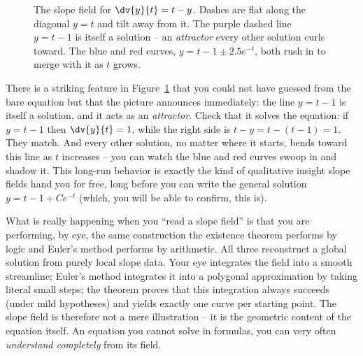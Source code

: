 \begin{figure}[H]
\centering
{}
\caption{The slope field for $\dv{y}{t}=t-y$. Dashes are flat along the diagonal $y=t$ and tilt away from it. The purple dashed line $y=t-1$ is itself a solution -- an \emph{attractor} every other solution curls toward. The blue and red curves, $y=t-1\pm 2.5e^{-t}$, both rush in to merge with it as $t$ grows.}
\label{ch36:fig-slopefield-ty}
\end{figure}

There is a striking feature in Figure~\ref{ch36:fig-slopefield-ty} that you could not have guessed from the bare equation but that the picture announces immediately: the line $y = t-1$ is itself a solution, and it acts as an \emph{attractor}. Check that it solves the equation: if $y = t-1$ then $\dv{y}{t} = 1$, while the right side is $t - y = t - (t-1) = 1$. They match. And every other solution, no matter where it starts, bends toward this line as $t$ increases -- you can watch the blue and red curves swoop in and shadow it. This long-run behavior is exactly the kind of qualitative insight slope fields hand you for free, long before you can write the general solution $y = t - 1 + Ce^{-t}$ (which, you will be able to confirm, this is).

\begin{happeningbox}
What is really happening when you ``read a slope field'' is that you are performing, by eye, the same construction the existence theorem performs by logic and Euler's method performs by arithmetic. All three reconstruct a global solution from purely local slope data. Your eye integrates the field into a smooth streamline; Euler's method integrates it into a polygonal approximation by taking literal small steps; the theorem proves that this integration always succeeds (under mild hypotheses) and yields exactly one curve per starting point. The slope field is therefore not a mere illustration -- it is the geometric content of the equation itself. An equation you cannot solve in formulas, you can very often \emph{understand completely} from its field.
\end{happeningbox}

